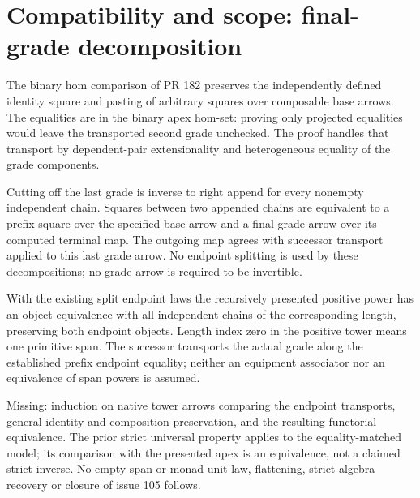 \documentclass{article}
\begin{document}
\section*{Compatibility and scope: final-grade decomposition}
The binary hom comparison of PR 182 preserves the independently defined identity square and pasting of arbitrary squares over composable base arrows. The equalities are in the binary apex hom-set: proving only projected equalities would leave the transported second grade unchecked. The proof handles that transport by dependent-pair extensionality and heterogeneous equality of the grade components.
\par Cutting off the last grade is inverse to right append for every nonempty independent chain. Squares between two appended chains are equivalent to a prefix square over the specified base arrow and a final grade arrow over its computed terminal map. The outgoing map agrees with successor transport applied to this last grade arrow. No endpoint splitting is used by these decompositions; no grade arrow is required to be invertible.
\par With the existing split endpoint laws the recursively presented positive power has an object equivalence with all independent chains of the corresponding length, preserving both endpoint objects. Length index zero in the positive tower means one primitive span. The successor transports the actual grade along the established prefix endpoint equality; neither an equipment associator nor an equivalence of span powers is assumed.
\par Missing: induction on native tower arrows comparing the endpoint transports, general identity and composition preservation, and the resulting functorial equivalence. The prior strict universal property applies to the equality-matched model; its comparison with the presented apex is an equivalence, not a claimed strict inverse. No empty-span or monad unit law, flattening, strict-algebra recovery or closure of issue 105 follows.
\end{document}

